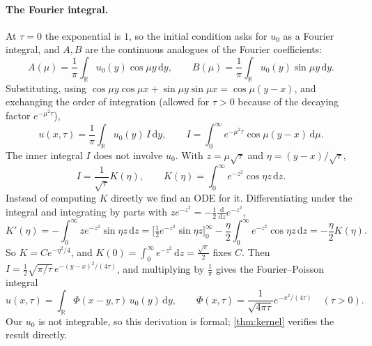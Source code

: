 \documentclass[11pt,a4paper]{article}
\theoremstyle{definition}
\theoremstyle{remark}
\newcommand{\dd}{\,\mathrm{d}}
\begin{document}
\paragraph{The Fourier integral.} At $\tau=0$ the exponential is $1$, so the initial condition asks for $u_0$ as a
Fourier integral, and $A,B$ are the continuous analogues of the Fourier coefficients:
\[
  A(\mu)=\frac1\pi\int_{\mathbb R}u_0(y)\cos\mu y\dd y,\qquad B(\mu)=\frac1\pi\int_{\mathbb R}u_0(y)\sin\mu y\dd y .
\]
Substituting, using $\cos\mu y\cos\mu x+\sin\mu y\sin\mu x=\cos\mu(y-x)$, and exchanging the order of
integration (allowed for $\tau>0$ because of the decaying factor $e^{-\mu^2\tau}$),
\[
  u(x,\tau)=\frac1\pi\int_{\mathbb R}u_0(y)\,I\dd y,\qquad
  I=\int_0^\infty e^{-\mu^2\tau}\cos\mu(y-x)\dd\mu .
\]
The inner integral $I$ does not involve $u_0$. With $z=\mu\sqrt\tau$ and $\eta=(y-x)/\sqrt\tau$,
\[
  I=\frac{1}{\sqrt\tau}K(\eta),\qquad K(\eta)=\int_0^\infty e^{-z^2}\cos\eta z\dd z .
\]
Instead of computing $K$ directly we find an ODE for it. Differentiating under the integral and integrating by
parts with $ze^{-z^2}=-\frac12\frac{\dd}{\dd z}e^{-z^2}$,
\[
  K'(\eta)=-\int_0^\infty ze^{-z^2}\sin\eta z\dd z
  =\Big[\tfrac12e^{-z^2}\sin\eta z\Big]_0^\infty-\frac\eta2\int_0^\infty e^{-z^2}\cos\eta z\dd z=-\frac\eta2K(\eta).
\]
So $K=Ce^{-\eta^2/4}$, and $K(0)=\int_0^\infty e^{-z^2}\dd z=\frac{\sqrt\pi}{2}$ fixes $C$. Then
$I=\frac12\sqrt{\pi/\tau}\,e^{-(y-x)^2/(4\tau)}$, and multiplying by $\frac1\pi$ gives the Fourier--Poisson integral
\begin{equation}\label{eq:conv}
  u(x,\tau)=\int_{\mathbb R}\Phi(x-y,\tau)\,u_0(y)\dd y,\qquad
  \Phi(x,\tau)=\frac{1}{\sqrt{4\pi\tau}}e^{-x^2/(4\tau)}\quad(\tau>0).
\end{equation}
Our $u_0$ is not integrable, so this derivation is formal; \cref{thm:kernel} verifies the result directly.
\end{document}
